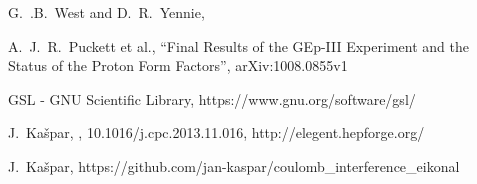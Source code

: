 \documentclass{appolb}
\begin{document}
\begin{thebibliography}{9}
	G.~.B.~West and D.~R.~Yennie,

	A.~J.~R.~Puckett et al.,
	``Final Results of the GEp-III Experiment and the Status of the Proton Form Factors'',
	arXiv:1008.0855v1

	GSL - GNU Scientific Library,
	https://www.gnu.org/software/gsl/

	J.~Ka\v{s}par,
	,
	10.1016/j.cpc.2013.11.016,
	http://elegent.hepforge.org/

	J.~Ka\v{s}par,
	https://github.com/jan-kaspar/coulomb\_interference\_eikonal
	
\end{thebibliography}
\end{document}
